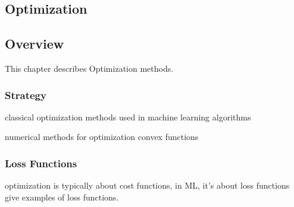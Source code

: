 

\renewcommand{\bibsection}{\subsection{\bibname}}
\begin{bibunit}

\chapter{Optimization}
\label{ch:optimization}

\section{Overview}
This chapter describes Optimization methods.


\subsection{Strategy}

classical optimization methods used in machine learning algorithms

numerical methods for optimization convex functions


\subsection{Loss Functions}
optimization is typically about cost functions, in ML, it's about loss functions 
give examples of loss functions.



\end{bibunit}
